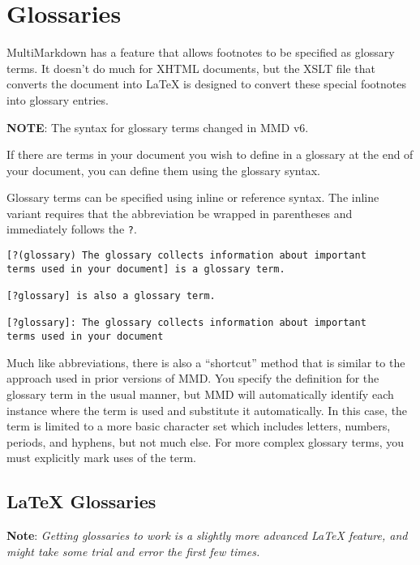 \section{Glossaries }
\label{glossaries}

MultiMarkdown has a feature that allows footnotes to be specified as glossary terms. It doesn't do much for XHTML documents, but the XSLT file that converts the document into LaTeX is designed to convert these special footnotes into glossary entries.

\textbf{NOTE}: The syntax for glossary terms changed in \gls{MMD} v6.

If there are terms in your document you wish to define in a \gls{glossary} at the end of your document, you can define them using the glossary syntax.

Glossary terms can be specified using inline or reference syntax. The inline variant requires that the abbreviation be wrapped in parentheses and immediately follows the \texttt{?}.

\begin{verbatim}
[?(glossary) The glossary collects information about important
terms used in your document] is a glossary term.

[?glossary] is also a glossary term.

[?glossary]: The glossary collects information about important
terms used in your document
\end{verbatim}

Much like abbreviations, there is also a ``shortcut'' method that is similar to the approach used in prior versions of \gls{MMD}. You specify the definition for the glossary term in the usual manner, but \gls{MMD} will automatically identify each instance where the term is used and substitute it automatically. In this case, the term is limited to a more basic character set which includes letters, numbers, periods, and hyphens, but not much else. For more complex glossary terms, you must explicitly mark uses of the term.

\subsection{LaTeX Glossaries }
\label{latexglossaries}

\textbf{Note}: \emph{Getting glossaries to work is a slightly more advanced LaTeX
feature, and might take some trial and error the first few times.}

